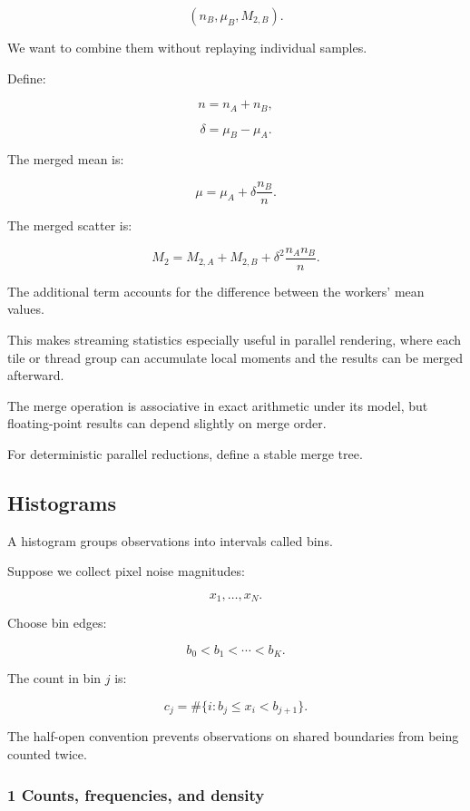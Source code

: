 \[
 (n_B,\mu_B,M_{2,B}).
\]

We want to combine them without replaying individual samples.

Define:

\[
 n=n_A+n_B,
\]

\[
 \delta=\mu_B-\mu_A.
\]

The merged mean is:

\[
 \boxed{ \mu= \mu_A+\delta\frac{n_B}{n} }.
\]

The merged scatter is:

\[
 \boxed{ M_2= M_{2,A}+M_{2,B} + \delta^2\frac{n_An_B}{n} }.
\]

The additional term accounts for the difference between the workers' mean values.

This makes streaming statistics especially useful in parallel rendering, where each tile or thread group can accumulate local moments and the results can be merged afterward.

The merge operation is associative in exact arithmetic under its model, but floating-point results can depend slightly on merge order.

For deterministic parallel reductions, define a stable merge tree.

\subsection{Histograms}\label{02-foundations-ii-ch030-histograms}

\hypertarget{02-foundations-ii-ch030-histograms}{}

A histogram groups observations into intervals called bins.

Suppose we collect pixel noise magnitudes:

\[
 x_1,\ldots,x_N.
\]

Choose bin edges:

\[
 b_0<b_1<\cdots<b_K.
\]

The count in bin \(j\) is:

\[
 \boxed{ c_j= \#\{i:b_j\le x_i < b_{j+1}\} }.
\]

The half-open convention prevents observations on shared boundaries from being counted twice.

\subsubsection{1 Counts, frequencies, and density}\label{02-foundations-ii-ch030-counts-frequencies-and-density}

